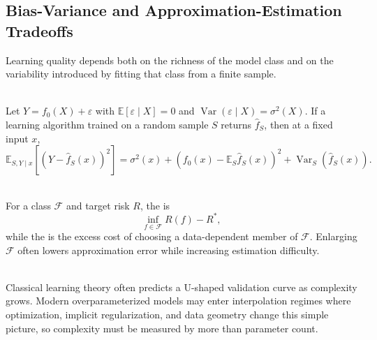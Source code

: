 \subsection{Bias-Variance and Approximation-Estimation Tradeoffs}

Learning quality depends both on the richness of the model class and on the variability introduced by fitting that class from a finite sample.

\begin{proposition} \label{prop:sl-bias-variance-regression} \\
Let $Y=f_0(X)+\varepsilon$ with $\mathbb{E}[\varepsilon\mid X]=0$ and $\operatorname{Var}(\varepsilon\mid X)=\sigma^2(X)$.  If a learning algorithm trained on a random sample $S$ returns $\widehat{f}_S$, then at a fixed input $x$,
\[
\mathbb{E}_{S,Y\mid x}\!\left[(Y-\widehat{f}_S(x))^2\right]
=
\sigma^2(x)
+\left(f_0(x)-\mathbb{E}_S\widehat{f}_S(x)\right)^2
+\operatorname{Var}_S(\widehat{f}_S(x)).
\]
\end{proposition}

\begin{definition} \label{def:sl-approximation-estimation-tradeoff} \\
For a class $\mathcal{F}$ and target risk $R$, the  is
\[
\inf_{f\in\mathcal{F}}R(f)-R^*,
\]
while the  is the excess cost of choosing a data-dependent member of $\mathcal{F}$.  Enlarging $\mathcal{F}$ often lowers approximation error while increasing estimation difficulty.
\end{definition}

\begin{remark} \label{rem:sl-model-complexity-tradeoff} \\
Classical learning theory often predicts a U-shaped validation curve as complexity grows.  Modern overparameterized models may enter interpolation regimes where optimization, implicit regularization, and data geometry change this simple picture, so complexity must be measured by more than parameter count.
\end{remark}
